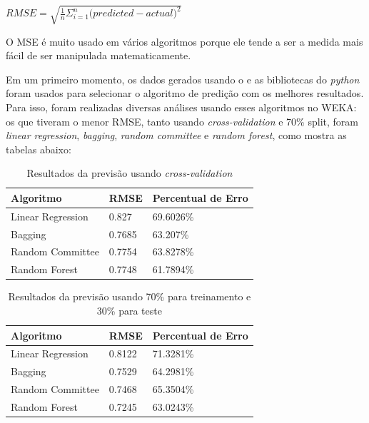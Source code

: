 $RMSE = \sqrt{\frac{1}{n}\Sigma_{i=1}^{n}{\Big({predicted-actual}\Big)^2}}$
 
O MSE é muito usado em vários algoritmos porque ele tende a ser a medida mais fácil de ser manipulada matematicamente.

Em um primeiro momento, os dados gerados usando o \pdi e as bibliotecas do \textit{python} foram usados para selecionar o algoritmo de predição com os melhores resultados. Para isso, foram realizadas diversas análises usando esses algoritmos no WEKA: os que tiveram o menor RMSE, tanto usando \textit{cross-validation} e 70\% split, foram \textit{linear regression}, \textit{bagging}, \textit{random committee} e \textit{random forest}, como mostra as tabelas abaixo:

\begin{longtable}{|l|l|l|}
\caption{Resultados da previsão usando \textit{cross-validation}}
\label{cvfull}
\\ \hline
\textbf{Algoritmo} & \textbf{RMSE} & \textbf{Percentual de Erro} \\ \hline
Linear Regression      & 0.827         & 69.6026\%                   \\ \hline
Bagging                & 0.7685        & 63.207\%                    \\ \hline
Random Committee       & 0.7754        & 63.8278\%                     \\ \hline
Random Forest          & 0.7748        & 61.7894\%                     \\ \hline
\end{longtable}


\begin{longtable}{|l|l|l|}
\caption{Resultados da previsão usando 70\% para treinamento e 30\% para teste}
\label{splitfull}
\\\hline
\textbf{Algoritmo} & \textbf{RMSE} & \textbf{Percentual de Erro} \\ \hline
Linear Regression      & 0.8122        & 71.3281\%                   \\ \hline
Bagging                & 0.7529        & 64.2981\%                   \\ \hline
Random Committee       & 0.7468        & 65.3504\%                   \\ \hline
Random Forest          & 0.7245        & 63.0243\%                   \\ \hline
\end{longtable}



